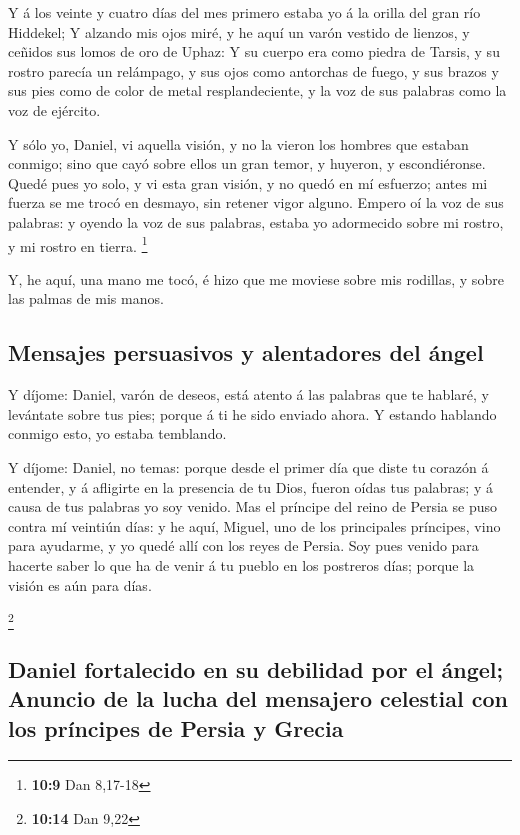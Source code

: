  Y á los veinte y cuatro días del mes primero estaba yo á
la orilla del gran río Hiddekel;  Y alzando mis ojos miré,
y he aquí un varón vestido de lienzos, y ceñidos sus lomos de oro de
Uphaz:  Y su cuerpo era como piedra de Tarsis, y su rostro
parecía un relámpago, y sus ojos como antorchas de fuego, y sus brazos y
sus pies como de color de metal resplandeciente, y la voz de sus
palabras como la voz de ejército.

 Y sólo yo, Daniel, vi aquella visión, y no la vieron los
hombres que estaban conmigo; sino que cayó sobre ellos un gran temor, y
huyeron, y escondiéronse.  Quedé pues yo solo, y vi esta
gran visión, y no quedó en mí esfuerzo; antes mi fuerza se me trocó en
desmayo, sin retener vigor alguno.  Empero oí la voz de
sus palabras: y oyendo la voz de sus palabras, estaba yo adormecido
sobre mi rostro, y mi rostro en tierra. \footnote{\textbf{10:9} Dan
  8,17-18}

 Y, he aquí, una mano me tocó, é hizo que me moviese
sobre mis rodillas, y sobre las palmas de mis manos.

\hypertarget{mensajes-persuasivos-y-alentadores-del-uxe1ngel}{%
\subsection{Mensajes persuasivos y alentadores del
ángel}\label{mensajes-persuasivos-y-alentadores-del-uxe1ngel}}

 Y díjome: Daniel, varón de deseos, está atento á las
palabras que te hablaré, y levántate sobre tus pies; porque á ti he sido
enviado ahora. Y estando hablando conmigo esto, yo estaba temblando.

 Y díjome: Daniel, no temas: porque desde el primer día
que diste tu corazón á entender, y á afligirte en la presencia de tu
Dios, fueron oídas tus palabras; y á causa de tus palabras yo soy
venido.  Mas el príncipe del reino de Persia se puso
contra mí veintiún días: y he aquí, Miguel, uno de los principales
príncipes, vino para ayudarme, y yo quedé allí con los reyes de Persia.
 Soy pues venido para hacerte saber lo que ha de venir á
tu pueblo en los postreros días; porque la visión es aún para días.

\footnote{\textbf{10:14} Dan 9,22}

\hypertarget{daniel-fortalecido-en-su-debilidad-por-el-uxe1ngel-anuncio-de-la-lucha-del-mensajero-celestial-con-los-pruxedncipes-de-persia-y-grecia}{%
\subsection{Daniel fortalecido en su debilidad por el ángel; Anuncio de
la lucha del mensajero celestial con los príncipes de Persia y
Grecia}\label{daniel-fortalecido-en-su-debilidad-por-el-uxe1ngel-anuncio-de-la-lucha-del-mensajero-celestial-con-los-pruxedncipes-de-persia-y-grecia}}

